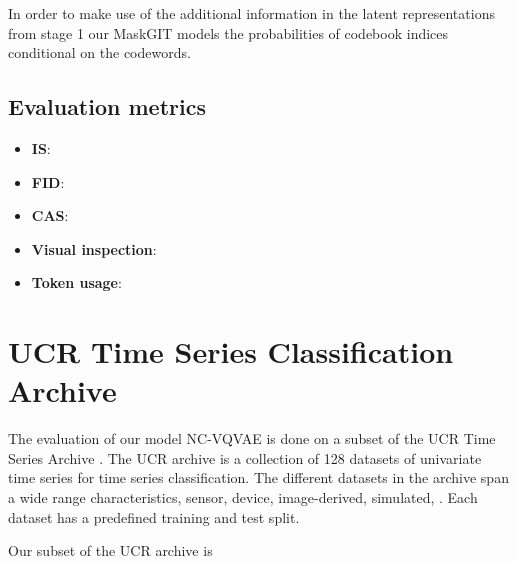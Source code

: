 \documentclass[../../thesis.tex]{subfiles}
\begin{document}
In order to make use of the additional information in the latent representations from stage 1 our MaskGIT models the probabilities of codebook indices conditional on the codewords.  

\subsection{Evaluation metrics}

\begin{itemize}
    \item \textbf{IS}:
    \item \textbf{FID}:
    \item \textbf{CAS}:
    \item \textbf{Visual inspection}:
    \item \textbf{Token usage}:
\end{itemize}


\section{UCR Time Series Classification Archive}
The evaluation of our model NC-VQVAE is done on a subset of the UCR Time Series Archive \cite{UCRArchive2018}. The UCR archive is a collection of 128 datasets of univariate time series for time series classification. The different datasets in the archive span a wide range characteristics, sensor, device, image-derived, simulated, . Each dataset has a predefined training and test split. \newline

Our subset of the UCR archive is



\end{document}
